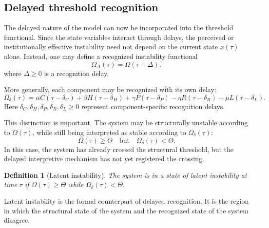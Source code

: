\documentclass[11pt]{article}
\newtheorem{definition}{Definition}
\begin{document}
\subsection{Delayed threshold recognition}

The delayed nature of the model can now be incorporated into the threshold functional. Since the state variables interact through delays, the perceived or institutionally effective instability need not depend on the current state $x(\tau)$ alone. Instead, one may define a recognized instability functional
\begin{equation}
\label{eq:omega-recognized}
\Omega_{\Delta}(\tau)
=
\Omega(\tau-\Delta),
\end{equation}
where $\Delta\geq 0$ is a recognition delay.

More generally, each component may be recognized with its own delay:
\begin{equation}
\label{eq:omega-component-delays}
\Omega_{\delta}(\tau)
=
\alpha C(\tau-\delta_C)
+
\beta H(\tau-\delta_H)
+
\gamma P(\tau-\delta_P)
-
\eta R(\tau-\delta_R)
-
\mu L(\tau-\delta_L).
\end{equation}
Here $\delta_C,\delta_H,\delta_P,\delta_R,\delta_L\geq 0$ represent component-specific recognition delays.

This distinction is important. The system may be structurally unstable according to $\Omega(\tau)$, while still being interpreted as stable according to $\Omega_{\delta}(\tau)$:
\[
\Omega(\tau)\geq \Theta
\quad
\text{but}
\quad
\Omega_{\delta}(\tau)<\Theta.
\]
In this case, the system has already crossed the structural threshold, but the delayed interpretive mechanism has not yet registered the crossing.

\begin{definition}[Latent instability]
	\label{def:latent-instability}
	The system is in a state of latent instability at time $\tau$ if
	$
	\Omega(\tau)\geq \Theta
	$
	while
$
\Omega_{\delta}(\tau)<\Theta.
$
\end{definition}

Latent instability is the formal counterpart of delayed recognition. It is the region in which the structural state of the system and the recognized state of the system disagree.



\end{document}
